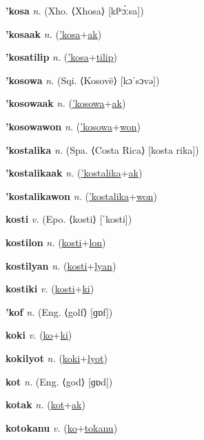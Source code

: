\textbf{\hypertarget{'kosa}{'kosa}} \textit{n.} (Xho. ⟨Xhosa⟩ [kǁʰɔ́ːsa])


\textbf{\hypertarget{'kosaak}{'kosaak}} \textit{n.} (\hyperlink{'kosa}{'kosa}+\allowbreak \hyperlink{ak}{ak})


\textbf{\hypertarget{'kosatilip}{'kosatilip}} \textit{n.} (\hyperlink{'kosa}{'kosa}+\allowbreak \hyperlink{tilip}{tilip})


\textbf{\hypertarget{'kosowa}{'kosowa}} \textit{n.} (Sqi. ⟨Kosovë⟩ [kɔˈsɔvə])


\textbf{\hypertarget{'kosowaak}{'kosowaak}} \textit{n.} (\hyperlink{'kosowa}{'kosowa}+\allowbreak \hyperlink{ak}{ak})


\textbf{\hypertarget{'kosowawon}{'kosowawon}} \textit{n.} (\hyperlink{'kosowa}{'kosowa}+\allowbreak \hyperlink{won}{won})


\textbf{\hypertarget{'kostalika}{'kostalika}} \textit{n.} (Spa. ⟨Costa Rica⟩ [kosta rika])


\textbf{\hypertarget{'kostalikaak}{'kostalikaak}} \textit{n.} (\hyperlink{'kostalika}{'kostalika}+\allowbreak \hyperlink{ak}{ak})


\textbf{\hypertarget{'kostalikawon}{'kostalikawon}} \textit{n.} (\hyperlink{'kostalika}{'kostalika}+\allowbreak \hyperlink{won}{won})


\textbf{\hypertarget{kosti}{kosti}} \textit{v.} (Epo. ⟨kosti⟩ [ˈkosti])


\textbf{\hypertarget{kostilon}{kostilon}} \textit{n.} (\hyperlink{kosti}{kosti}+\allowbreak \hyperlink{lon}{lon})


\textbf{\hypertarget{kostilyan}{kostilyan}} \textit{n.} (\hyperlink{kosti}{kosti}+\allowbreak \hyperlink{lyan}{lyan})


\textbf{\hypertarget{kostiki}{kostiki}} \textit{v.} (\hyperlink{kosti}{kosti}+\allowbreak \hyperlink{ki}{ki})


\textbf{\hypertarget{'kof}{'kof}} \textit{n.} (Eng. ⟨golf⟩ [ɡɒf])


\textbf{\hypertarget{koki}{koki}} \textit{v.} (\hyperlink{ko}{ko}+\allowbreak \hyperlink{ki}{ki})


\textbf{\hypertarget{kokilyot}{kokilyot}} \textit{n.} (\hyperlink{koki}{koki}+\allowbreak \hyperlink{lyot}{lyot})


\textbf{\hypertarget{kot}{kot}} \textit{n.} (Eng. ⟨god⟩ [ɡɒd])


\textbf{\hypertarget{kotak}{kotak}} \textit{n.} (\hyperlink{kot}{kot}+\allowbreak \hyperlink{ak}{ak})


\textbf{\hypertarget{kotokanu}{kotokanu}} \textit{v.} (\hyperlink{ko}{ko}+\allowbreak \hyperlink{tokanu}{tokanu})


